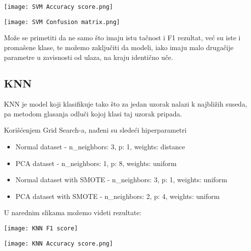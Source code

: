 \documentclass[a4paper]{article}
\begin{document}
        \begin{center}
            \label{im:SVM Accuracy score}
            \texttt{[image: SVM Accuracy score.png]}
        \end{center}

        \begin{center}
            \label{im:SVM Confusion matrix}
            \texttt{[image: SVM Confusion matrix.png]}
        \end{center}
        Može se primetiti da ne samo što imaju istu tačnost i F1 rezultat, već su iste i promašene klase, te možemo zaključiti da modeli, iako imaju malo drugačije parametre u zavisnosti od ulaza, na kraju identično uče.

    \subsection{KNN}
        KNN je model koji klasifikuje tako što za jedan uzorak nalazi k najbližih suseda, pa metodom glasanja odluči kojoj klasi taj uzorak pripada.

        \par Korišćenjem Grid Search-a, nađeni su sledeći hiperparametri
        \begin{itemize}
            \item Normal dataset - n\_neighbors: 3, p: 1, weights: distance
            \item PCA dataset - n\_neighbors: 1, p: 8, weights: uniform
            \item Normal dataset with SMOTE - n\_neighbors: 3, p: 1, weights: uniform
            \item PCA dataset with SMOTE - n\_neighbors: 2, p: 4, weights: uniform
        \end{itemize}

        U narednim slikama možemo videti rezultate:

        \begin{center}
            \label{im:KNN F1 score}
            \texttt{[image: KNN F1 score]}
        \end{center}
        
        \begin{center}
            \label{im:KNN Accuracy score}
            \texttt{[image: KNN Accuracy score.png]}
        \end{center}
\end{document}
